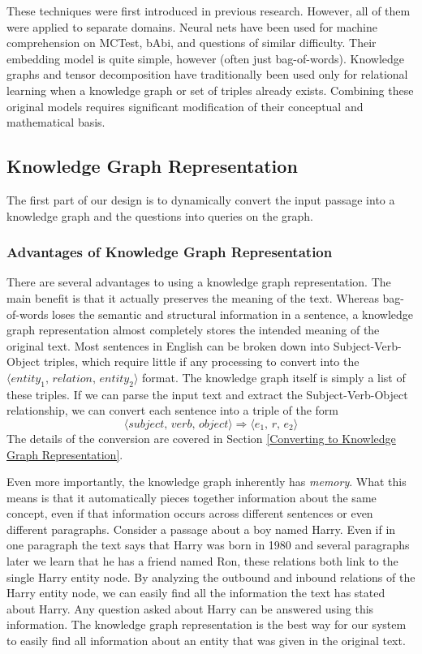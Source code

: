 \documentclass[pageno]{final_paper}
\begin{document}
These techniques were first introduced in previous research. However, all of
them were applied to separate domains. Neural nets have been used for machine
comprehension on MCTest, bAbi, and questions of similar difficulty. Their
embedding model is quite simple, however (often just bag-of-words). Knowledge
graphs and tensor decomposition have traditionally been used only for relational
learning when a knowledge graph or set of triples already exists. Combining
these original models requires significant modification of their conceptual and
mathematical basis.

\subsection{Knowledge Graph Representation}
\label{Knowledge Graph Representation}

The first part of our design is to dynamically convert the input passage into a
knowledge graph and the questions into queries on the graph.

\subsubsection{Advantages of Knowledge Graph Representation}
\label{Advantages of Knowledge Graph Representation}

There are several advantages to using a knowledge graph representation. The main
benefit is that it actually preserves the meaning of the text. Whereas
bag-of-words loses the semantic and structural information in a sentence, a
knowledge graph representation almost completely stores the intended meaning of
the original text. Most sentences in English can be broken down into
Subject-Verb-Object triples, which require little if any processing to convert
into the $\langle \textit{entity}_1, \, \textit{relation}, \, \textit{entity}_2
\rangle$ format. The knowledge graph itself is simply a list of these triples.
If we can parse the input text and extract the Subject-Verb-Object relationship,
we can convert each sentence into a triple of the form
$$\langle \textit{subject}, \, \textit{verb}, \, \textit{object} \rangle
\Rightarrow \langle e_1, \, r, \, e_2 \rangle$$
The details of the conversion are covered in Section \ref{Converting to
Knowledge Graph Representation}.

Even more importantly, the knowledge graph inherently has \textit{memory}. What
this means is that it automatically pieces together information about the same
concept, even if that information occurs across different sentences or even
different paragraphs. Consider a passage about a boy named Harry. Even if in one
paragraph the text says that Harry was born in 1980 and several paragraphs later
we learn that he has a friend named Ron, these relations both link to the single
Harry entity node. By analyzing the outbound and inbound relations of the Harry
entity node, we can easily find all the information the text has stated about
Harry. Any question asked about Harry can be answered using this information.
The knowledge graph representation is the best way for our system to easily find
all information about an entity that was given in the original text.
\end{document}
